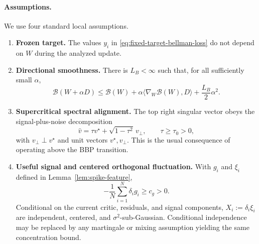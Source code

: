 \paragraph{Assumptions.}
We use four standard local assumptions.
\begin{enumerate}
    \item[(A1)] \textbf{Frozen target.}  The values $y_i$ in
    \eqref{eq:fixed-target-bellman-loss} do not depend on $W$ during the
    analyzed update.
    \item[(A2)] \textbf{Directional smoothness.}  There is $L_B<\infty$ such
    that, for all sufficiently small $\alpha$,
    \begin{equation}
        \mathcal B(W+\alpha D)
        \le \mathcal B(W)
        +\alpha\langle\nabla_W\mathcal B(W),D\rangle
        +\frac{L_B}{2}\alpha^2.
        \label{eq:directional-smoothness}
    \end{equation}
    \item[(A3)] \textbf{Supercritical spectral alignment.}  The top right
    singular vector obeys the signal-plus-noise decomposition
    \begin{equation}
        \hat v=\tau v^\star+\sqrt{1-\tau^2}\,v_\perp,
        \qquad \tau\ge\tau_0>0,
        \label{eq:bbp-alignment}
    \end{equation}
    with $v_\perp\perp v^\star$ and unit vectors $v^\star,v_\perp$.  This is
    the usual consequence of operating above the BBP transition.
    \item[(A4)] \textbf{Useful signal and centered orthogonal fluctuation.}
    With $g_i$ and $\xi_i$ defined in Lemma~\ref{lem:spike-feature},
    \begin{equation}
        -\frac1N\sum_{i=1}^N\delta_i g_i\ge c_g>0.
        \label{eq:useful-signal}
    \end{equation}
    Conditional on the current critic, residuals, and signal components,
    $X_i:=\delta_i\xi_i$ are independent, centered, and
    $\sigma^2$-sub-Gaussian.  Conditional independence may be replaced by any
    martingale or mixing assumption yielding the same concentration bound.
\end{enumerate}


